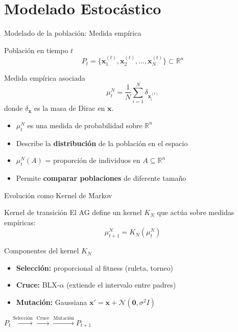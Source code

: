 \documentclass[10pt, aspectratio=169]{beamer}
\begin{document}
\section{Modelado Estocástico}

\begin{frame}{Modelado de la población: Medida empírica}
\begin{block}{Población en tiempo $t$}
\[
P_t = \{\mathbf{x}_1^{(t)}, \mathbf{x}_2^{(t)}, \dots, \mathbf{x}_N^{(t)}\} \subset \mathbb{R}^n
\]
\end{block}

\begin{block}{Medida empírica asociada}
\[
\mu_t^N = \frac{1}{N} \sum_{i=1}^N \delta_{\mathbf{x}_i^{(t)}}
\]
donde $\delta_{\mathbf{x}}$ es la masa de Dirac en $\mathbf{x}$.
\end{block}

\begin{itemize}
    \item $\mu_t^N$ es una \alert{medida de probabilidad} sobre $\mathbb{R}^n$
    \item Describe la \textbf{distribución} de la población en el espacio
    \item $\mu_t^N(A)$ = proporción de individuos en $A \subseteq \mathbb{R}^n$
    \item Permite \textbf{comparar poblaciones} de diferente tamaño
\end{itemize}
\end{frame}

\begin{frame}{Evolución como Kernel de Markov}
\begin{block}{Kernel de transición}
El AG define un kernel $K_N$ que actúa sobre medidas empíricas:
\[
\mu_{t+1}^N = K_N(\mu_t^N)
\]
\end{block}

\begin{block}{Componentes del kernel $K_N$}
\begin{itemize}
    \item \textbf{Selección:} proporcional al fitness (ruleta, torneo)
    \item \textbf{Cruce:} BLX-$\alpha$ (extiende el intervalo entre padres)
    \item \textbf{Mutación:} Gaussiana $\mathbf{x}' = \mathbf{x} + \mathcal{N}(\mathbf{0}, \sigma^2 I)$
\end{itemize}
\end{block}

\vspace{2mm}
\centering
\alert{$P_t \xrightarrow{\text{Selección}} \xrightarrow{\text{Cruce}} \xrightarrow{\text{Mutación}} P_{t+1}$}
\end{frame}
\end{document}

